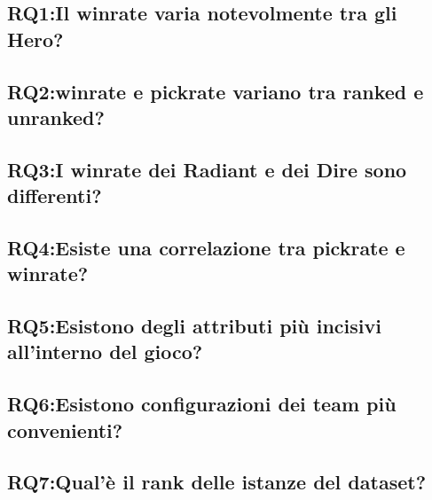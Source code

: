 \subsection{RQ1:Il winrate varia notevolmente tra gli Hero?}


\subsection{RQ2:winrate e pickrate variano tra ranked e unranked?}


\subsection{RQ3:I winrate dei Radiant e dei Dire sono differenti?}


\subsection{RQ4:Esiste una correlazione tra pickrate e winrate?}


\subsection{RQ5:Esistono degli attributi più incisivi all'interno del gioco?}


\subsection{RQ6:Esistono configurazioni dei team più convenienti?}


\subsection{RQ7:Qual'è il rank delle istanze del dataset?}
